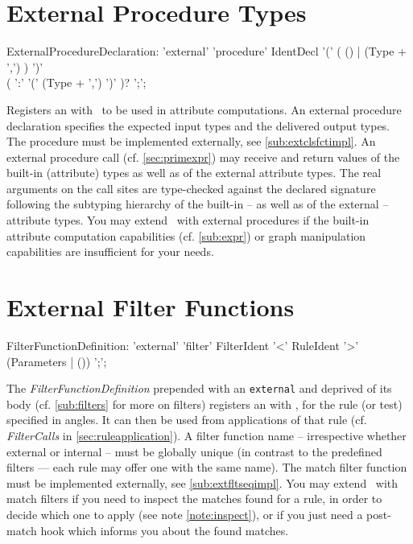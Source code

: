 \section{External Procedure Types}\label{sub:extproc}
\begin{rail}
  ExternalProcedureDeclaration: 'external' 'procedure' IdentDecl '(' ( () | (Type + ',') ) ')' \\ ( ':' '(' (Type + ',') ')' )? ';';
\end{rail}
Registers an  with \GrG~to be used in attribute computations.
An external procedure declaration specifies the expected input types and the delivered output types.
The procedure must be implemented externally, see \ref{sub:extclsfctimpl}.
An external procedure call (cf. \ref{sec:primexpr}) may receive and return values of the built-in (attribute) types as well as of the external attribute types.
The real arguments on the call sites are type-checked against the declared signature following the subtyping hierarchy of the built-in -- as well as of the external -- attribute types.
You may extend \GrG~with external procedures if the built-in attribute computation capabilities (cf. \ref{sub:expr}) or graph manipulation capabilities are insufficient for your needs.

\section{External Filter Functions}\label{sub:extflt}

\begin{rail}
	FilterFunctionDefinition: 'external' 'filter' FilterIdent '<' RuleIdent '>' (Parameters | ()) ';';
\end{rail}

The \emph{FilterFunctionDefinition} prepended with an \texttt{external} and deprived of its body (cf. \ref{sub:filters} for more on filters)
registers an  with \GrG, for the rule (or test) specified in angles.
It can then be used from applications of that rule (cf. \emph{FilterCalls} in \ref{sec:ruleapplication}).
A filter function name -- irrespective whether external or internal -- must be globally unique (in contrast to the predefined filters --- each rule may offer one with the same name).
The match filter function must be implemented externally, see \ref{sub:extfltseqimpl}.
You may extend \GrG~with match filters if you need to inspect the matches found for a rule, in order to decide which one to apply (see note \ref{note:inspect}), or if you just need a post-match hook which informs you about the found matches.

